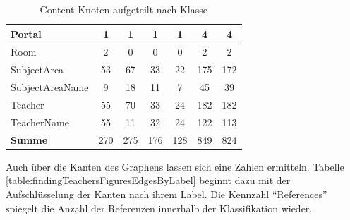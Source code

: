 \begin{table}[htb]
\begin{tabular}{|l|c|c|c|c|c|c|}
            Portal             & 1                                  & 1                                   & 1                                    & 1                                  & 4                                   & 4                                  \\ \hline
            Room               & 2                                  & 0                                   & 0                                    & 0                                  & 2                                   & 2                                  \\ \hline
            SubjectArea        & 53                                 & 67                                  & 33                                   & 22                                 & 175                                 & 172                                \\ \hline
            SubjectAreaName    & 9                                  & 18                                  & 11                                   & 7                                  & 45                                  & 39                                 \\ \hline
            Teacher            & 55                                 & 70                                  & 33                                   & 24                                 & 182                                 & 182                                \\ \hline
            TeacherName        & 55                                 & 11                                  & 32                                   & 24                                 & 122                                 & 113                                \\ \hline
            \hline
            \textbf{Summe}     & 270                                & 275                                 & 176                                  & 128                                & 849                                 & 824                                \\ \hline
        \end{tabular}
        \caption{Content Knoten aufgeteilt nach Klasse}
        \label{table:findingsTeachersFiguresContentNodesByClass}
    \end{table}

    Auch über die Kanten des Graphens lassen sich eine Zahlen ermitteln.
    Tabelle \ref{table:findingTeachersFiguresEdgesByLabel} beginnt dazu
    mit der Aufschlüsselung der Kanten nach ihrem Label.
    Die Kennzahl "`References"' spiegelt die Anzahl der Referenzen innerhalb der Klassifikation wieder.

